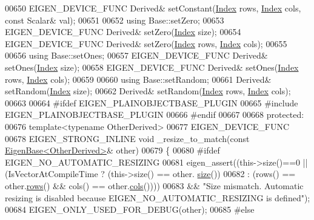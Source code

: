 \begin{DoxyCode}
00650     EIGEN\_DEVICE\_FUNC Derived& setConstant(\hyperlink{namespace_eigen_a62e77e0933482dafde8fe197d9a2cfde}{Index} rows, \hyperlink{namespace_eigen_a62e77e0933482dafde8fe197d9a2cfde}{Index} cols, \textcolor{keyword}{const} Scalar& val);
00651 
00652     \textcolor{keyword}{using} Base::setZero;
00653     EIGEN\_DEVICE\_FUNC Derived& setZero(\hyperlink{namespace_eigen_a62e77e0933482dafde8fe197d9a2cfde}{Index} size);
00654     EIGEN\_DEVICE\_FUNC Derived& setZero(\hyperlink{namespace_eigen_a62e77e0933482dafde8fe197d9a2cfde}{Index} rows, \hyperlink{namespace_eigen_a62e77e0933482dafde8fe197d9a2cfde}{Index} cols);
00655 
00656     \textcolor{keyword}{using} Base::setOnes;
00657     EIGEN\_DEVICE\_FUNC Derived& setOnes(\hyperlink{namespace_eigen_a62e77e0933482dafde8fe197d9a2cfde}{Index} size);
00658     EIGEN\_DEVICE\_FUNC Derived& setOnes(\hyperlink{namespace_eigen_a62e77e0933482dafde8fe197d9a2cfde}{Index} rows, \hyperlink{namespace_eigen_a62e77e0933482dafde8fe197d9a2cfde}{Index} cols);
00659 
00660     \textcolor{keyword}{using} Base::setRandom;
00661     Derived& setRandom(\hyperlink{namespace_eigen_a62e77e0933482dafde8fe197d9a2cfde}{Index} size);
00662     Derived& setRandom(\hyperlink{namespace_eigen_a62e77e0933482dafde8fe197d9a2cfde}{Index} rows, \hyperlink{namespace_eigen_a62e77e0933482dafde8fe197d9a2cfde}{Index} cols);
00663 
00664 \textcolor{preprocessor}{    #ifdef EIGEN\_PLAINOBJECTBASE\_PLUGIN}
00665 \textcolor{preprocessor}{    #include EIGEN\_PLAINOBJECTBASE\_PLUGIN}
00666 \textcolor{preprocessor}{    #endif}
00667 
00668   \textcolor{keyword}{protected}:
00676     \textcolor{keyword}{template}<\textcolor{keyword}{typename} OtherDerived>
00677     EIGEN\_DEVICE\_FUNC 
00678     EIGEN\_STRONG\_INLINE \textcolor{keywordtype}{void} \_resize\_to\_match(\textcolor{keyword}{const} \hyperlink{group___core___module_struct_eigen_1_1_eigen_base}{EigenBase<OtherDerived>}& other)
00679     \{
00680 \textcolor{preprocessor}{      #ifdef EIGEN\_NO\_AUTOMATIC\_RESIZING}
00681       eigen\_assert((this->size()==0 || (IsVectorAtCompileTime ? (this->size() == other.
      \hyperlink{group___core___module_ac2c9348df3bb9c0044dbae6c278a8977}{size}())
00682                  : (rows() == other.\hyperlink{group___core___module_a8141320ba8df384426c298b32b000d8e}{rows}() && cols() == other.\hyperlink{group___core___module_a7b0b45c7351847696c911ce8aa2abbdb}{cols}())))
00683         && \textcolor{stringliteral}{"Size mismatch. Automatic resizing is disabled because EIGEN\_NO\_AUTOMATIC\_RESIZING is defined"});
00684       EIGEN\_ONLY\_USED\_FOR\_DEBUG(other);
00685 \textcolor{preprocessor}{      #else}

\end{DoxyCode}
